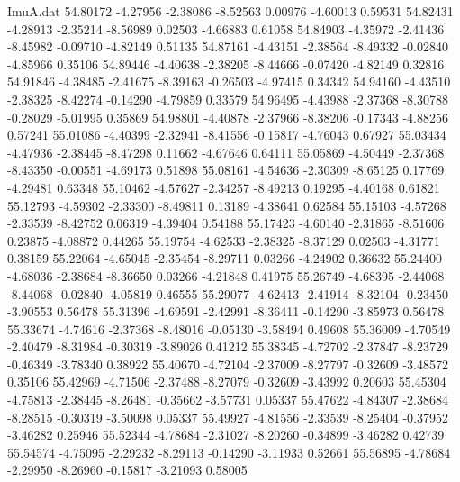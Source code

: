 \begin{filecontents}{ImuA.dat}
  54.80172   -4.27956   -2.38086   -8.52563    0.00976   -4.60013    0.59531
  54.82431   -4.28913   -2.35214   -8.56989    0.02503   -4.66883    0.61058
  54.84903   -4.35972   -2.41436   -8.45982   -0.09710   -4.82149    0.51135
  54.87161   -4.43151   -2.38564   -8.49332   -0.02840   -4.85966    0.35106
  54.89446   -4.40638   -2.38205   -8.44666   -0.07420   -4.82149    0.32816
  54.91846   -4.38485   -2.41675   -8.39163   -0.26503   -4.97415    0.34342
  54.94160   -4.43510   -2.38325   -8.42274   -0.14290   -4.79859    0.33579
  54.96495   -4.43988   -2.37368   -8.30788   -0.28029   -5.01995    0.35869
  54.98801   -4.40878   -2.37966   -8.38206   -0.17343   -4.88256    0.57241
  55.01086   -4.40399   -2.32941   -8.41556   -0.15817   -4.76043    0.67927
  55.03434   -4.47936   -2.38445   -8.47298    0.11662   -4.67646    0.64111
  55.05869   -4.50449   -2.37368   -8.43350   -0.00551   -4.69173    0.51898
  55.08161   -4.54636   -2.30309   -8.65125    0.17769   -4.29481    0.63348
  55.10462   -4.57627   -2.34257   -8.49213    0.19295   -4.40168    0.61821
  55.12793   -4.59302   -2.33300   -8.49811    0.13189   -4.38641    0.62584
  55.15103   -4.57268   -2.33539   -8.42752    0.06319   -4.39404    0.54188
  55.17423   -4.60140   -2.31865   -8.51606    0.23875   -4.08872    0.44265
  55.19754   -4.62533   -2.38325   -8.37129    0.02503   -4.31771    0.38159
  55.22064   -4.65045   -2.35454   -8.29711    0.03266   -4.24902    0.36632
  55.24400   -4.68036   -2.38684   -8.36650    0.03266   -4.21848    0.41975
  55.26749   -4.68395   -2.44068   -8.44068   -0.02840   -4.05819    0.46555
  55.29077   -4.62413   -2.41914   -8.32104   -0.23450   -3.90553    0.56478
  55.31396   -4.69591   -2.42991   -8.36411   -0.14290   -3.85973    0.56478
  55.33674   -4.74616   -2.37368   -8.48016   -0.05130   -3.58494    0.49608
  55.36009   -4.70549   -2.40479   -8.31984   -0.30319   -3.89026    0.41212
  55.38345   -4.72702   -2.37847   -8.23729   -0.46349   -3.78340    0.38922
  55.40670   -4.72104   -2.37009   -8.27797   -0.32609   -3.48572    0.35106
  55.42969   -4.71506   -2.37488   -8.27079   -0.32609   -3.43992    0.20603
  55.45304   -4.75813   -2.38445   -8.26481   -0.35662   -3.57731    0.05337
  55.47622   -4.84307   -2.38684   -8.28515   -0.30319   -3.50098    0.05337
  55.49927   -4.81556   -2.33539   -8.25404   -0.37952   -3.46282    0.25946
  55.52344   -4.78684   -2.31027   -8.20260   -0.34899   -3.46282    0.42739
  55.54574   -4.75095   -2.29232   -8.29113   -0.14290   -3.11933    0.52661
  55.56895   -4.78684   -2.29950   -8.26960   -0.15817   -3.21093    0.58005

\end{filecontents}
